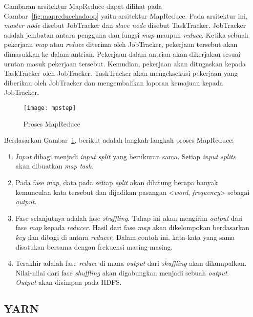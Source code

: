 Gambaran arsitektur MapReduce dapat dilihat pada Gambar~\ref{fig:mapreducehadoop} yaitu arsitektur MapReduce. Pada arsitektur ini, \textit{master node} disebut JobTracker dan \textit{slave node} disebut TaskTracker. JobTracker adalah jembatan antara pengguna dan fungsi \textit{map} maupun \textit{reduce}. Ketika sebuah pekerjaan \textit{map} atau \textit{reduce} diterima oleh JobTracker, pekerjaan tersebut akan dimasukkan ke dalam antrian. Pekerjaan dalam antrian akan dikerjakan sesuai urutan masuk pekerjaan tersebut. Kemudian, pekerjaan akan ditugaskan kepada TaskTracker oleh JobTracker. TaskTracker akan mengeksekusi pekerjaan yang diberikan oleh JobTracker dan mengembalikan laporan kemajuan kepada JobTracker.   


\begin{figure}[H]
    \centering  
    \texttt{[image: mpstep]}  
    \caption[Proses MapReduce]{Proses MapReduce} 
    \label{fig:mpstep} 
\end{figure}

Berdasarkan Gambar~\ref{fig:mpstep}, berikut adalah langkah-langkah proses  MapReduce:

\begin{enumerate}
\item \textit{Input} dibagi menjadi \textit{input split} yang berukuran sama. Setiap \textit{input splits} akan dibuatkan \textit{map task}.

\item Pada fase \textit{map}, data pada setiap \textit{split} akan dihitung berapa banyak kemunculan kata tersebut dan dijadikan pasangan <\textit{word}, \textit{frequency}> sebagai \textit{output}.

\item Fase selanjutnya adalah fase \textit{shuffling}. Tahap ini akan mengirim \textit{output} dari fase \textit{map} kepada \textit{reducer}. Hasil dari fase \textit{map} akan dikelompokan berdasarkan \textit{key} dan dibagi di antara \textit{reducer}. Dalam contoh ini, kata-kata yang sama disatukan bersama dengan frekuensi masing-masing.


\item Terakhir adalah fase \textit{reduce} di mana \textit{output} dari \textit{shuffling} akan dikumpulkan. Nilai-nilai dari fase \textit{shuffling} akan digabungkan menjadi sebuah \textit{output}. \textit{Output} akan disimpan pada HDFS.

\end{enumerate}

\subsection{YARN}


